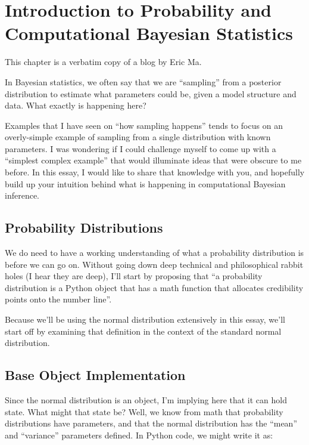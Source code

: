 
\chapter{Introduction to Probability and Computational Bayesian Statistics}
\label{chap:IntroductiontoProbabilityandComputationalBayesianStatistics}

This chapter is a verbatim copy of a blog \cite{EricMaIntroBayes2019} by Eric Ma.


In Bayesian statistics, we often say that we are ``sampling'' from a posterior distribution to estimate what parameters could be, given a model structure and data. What exactly is happening here?

Examples that I have seen on ``how sampling happens'' tends to focus on an overly-simple example of sampling from a single distribution with known parameters. I was wondering if I could challenge myself to come up with a ``simplest complex example'' that would illuminate ideas that were obscure to me before. In this essay, I would like to share that knowledge with you, and hopefully build up your intuition behind what is happening in computational Bayesian inference.

\section{Probability Distributions}

We do need to have a working understanding of what a probability distribution is before we can go on. Without going down deep technical and philosophical rabbit holes (I hear they are deep), I'll start by proposing that ``a probability distribution is a Python object that has a math function that allocates credibility points onto the number line''.

Because we'll be using the normal distribution extensively in this essay, we'll start off by examining that definition in the context of the standard normal distribution.

\section{Base Object Implementation}

Since the normal distribution is an object, I'm implying here that it can hold state. What might that state be? Well, we know from math that probability distributions have parameters, and that the normal distribution has the ``mean'' and ``variance'' parameters defined. In Python code, we might write it as:

